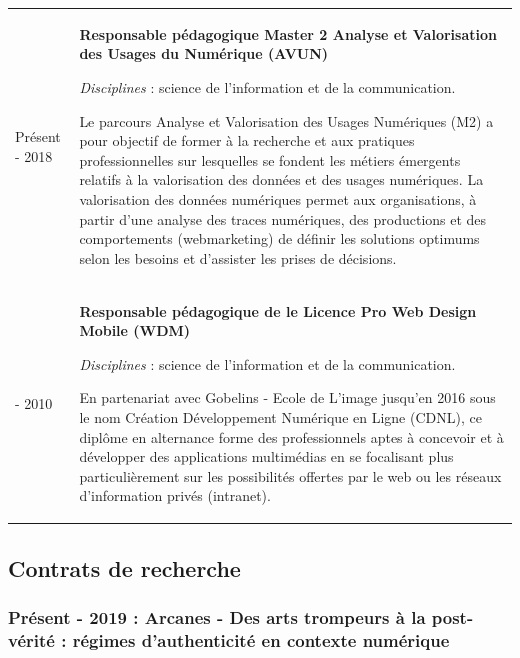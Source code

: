 \documentclass[
  a4paper,
  DIV=11,
  numbers=noendperiod]{scrreprt}
\begin{document}
\begin{longtable}[]{@{}
  >{\raggedright\arraybackslash}p{}
  >{\raggedright\arraybackslash}p{}@{}}
\toprule\noalign{}
\endhead
\bottomrule\noalign{}
\endlastfoot
Présent - 2018 & \textbf{Responsable pédagogique Master 2 Analyse et
Valorisation des Usages du Numérique (AVUN)}

\emph{Disciplines} : science de l'information et de la communication.

Le parcours Analyse et Valorisation des Usages Numériques (M2) a pour
objectif de former à la recherche et aux pratiques professionnelles sur
lesquelles se fondent les métiers émergents relatifs à la valorisation
des données et des usages numériques. La valorisation des données
numériques permet aux organisations, à partir d'une analyse des traces
numériques, des productions et des comportements (webmarketing) de
définir les solutions optimums selon les besoins et d'assister les
prises de décisions. \\
2019 - 2010 & \textbf{Responsable pédagogique de le Licence Pro Web
Design Mobile (WDM)}

\emph{Disciplines} : science de l'information et de la communication.

En partenariat avec Gobelins - Ecole de L'image jusqu'en 2016 sous le
nom Création Développement Numérique en Ligne (CDNL), ce diplôme en
alternance forme des professionnels aptes à concevoir et à développer
des applications multimédias en se focalisant plus particulièrement sur
les possibilités offertes par le web ou les réseaux d'information privés
(intranet). \\
\end{longtable}

\subsection{Contrats de recherche}\label{contrats-de-recherche}

\subsubsection*{Présent - 2019 : Arcanes - Des arts trompeurs à la
post-vérité : régimes d'authenticité en contexte
numérique}\label{sec-projetArcanes}
\end{document}
